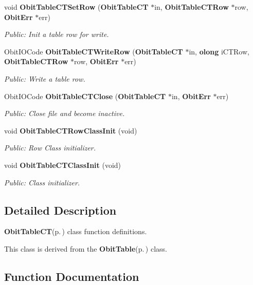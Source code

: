\begin{CompactItemize}
void {\bf Obit\-Table\-CTSet\-Row} ({\bf Obit\-Table\-CT} $\ast$in, {\bf Obit\-Table\-CTRow} $\ast$row, {\bf Obit\-Err} $\ast$err)
\begin{CompactList}\small\item\em Public: Init a table row for write. \item\end{CompactList}\item 
Obit\-IOCode {\bf Obit\-Table\-CTWrite\-Row} ({\bf Obit\-Table\-CT} $\ast$in, {\bf olong} i\-CTRow, {\bf Obit\-Table\-CTRow} $\ast$row, {\bf Obit\-Err} $\ast$err)
\begin{CompactList}\small\item\em Public: Write a table row. \item\end{CompactList}\item 
Obit\-IOCode {\bf Obit\-Table\-CTClose} ({\bf Obit\-Table\-CT} $\ast$in, {\bf Obit\-Err} $\ast$err)
\begin{CompactList}\small\item\em Public: Close file and become inactive. \item\end{CompactList}\item 
void {\bf Obit\-Table\-CTRow\-Class\-Init} (void)
\begin{CompactList}\small\item\em Public: Row Class initializer. \item\end{CompactList}\item 
void {\bf Obit\-Table\-CTClass\-Init} (void)
\begin{CompactList}\small\item\em Public: Class initializer. \item\end{CompactList}\end{CompactItemize}


\subsection{Detailed Description}
{\bf Obit\-Table\-CT}{\rm (p.\,\pageref{structObitTableCT})} class function definitions. 

This class is derived from the {\bf Obit\-Table}{\rm (p.\,\pageref{structObitTable})} class.

\subsection{Function Documentation}
